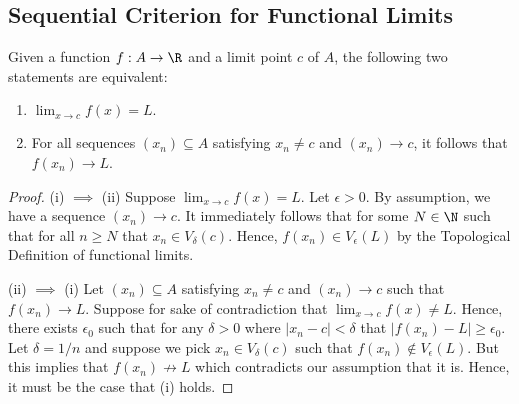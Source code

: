 \subsection{Sequential Criterion for Functional Limits}

\begin{tcolorbox}
    \begin{thm}
    Given a function \( f: A \to \R  \) and a limit point \( c \) of \( A \), the following two statements are equivalent: 
    \begin{enumerate}
        \item[(i)] \( \lim_{ x \to c } f(x) = L. \)
        \item[(ii)] For all sequences \( (x_n) \subseteq A  \) satisfying \( x_n \neq c  \) and \( (x_n) \to c  \), it follows that \( f(x_n) \to L  \).
    \end{enumerate}
    \end{thm}
\end{tcolorbox}

\begin{proof}
    (i) \( \implies \) (ii) Suppose \( \lim_{ x  \to c } f(x) = L  \). Let \( \epsilon > 0  \). By assumption, we have a sequence \( (x_n) \to c  \). It immediately follows that for some \( N \in \N  \) such that for all \( n \geq N  \) that \( x_n \in V_{\delta}(c) \). Hence, \( f(x_n) \in V_{\epsilon }(L) \) by the Topological Definition of functional limits.
 
    (ii) \( \implies \) (i) Let \( (x_n) \subseteq A  \) satisfying \( x_n \neq c  \) and \( (x_n) \to  c \) such that \( f(x_n) \to L  \). Suppose for sake of contradiction that \( \lim_{ x \to c } f(x) \neq L  \). Hence, there exists \( \epsilon_0 \) such that for any \( \delta > 0  \) where \( | x_n -c  | < \delta \) that \( | f(x_n) - L  | \geq \epsilon_0 \). Let \( \delta = 1/n \) and suppose we pick \( x_n \in V_{\delta}(c) \) such that \( f(x_n) \notin V_{\epsilon }(L) \). But this implies that \( f(x_n) \not \to L  \) which contradicts our assumption that it is. Hence, it must be the case that (i) holds.
\end{proof}

